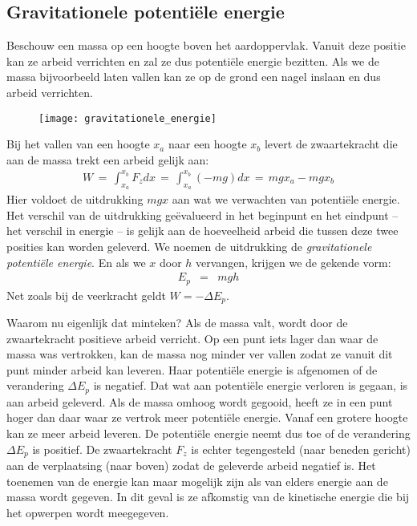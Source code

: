 \subsection{Gravitationele potenti\"ele energie}\label{gravitationele potentiele energie}

Beschouw een massa op een hoogte boven het aardoppervlak. Vanuit deze positie kan ze arbeid verrichten en zal ze dus potenti\"ele energie bezitten. Als we de massa bijvoorbeeld laten vallen kan ze op de grond een nagel inslaan en dus arbeid verrichten.
\begin{figure}[h]
\begin{center}
\texttt{[image: gravitationele\_energie]}
\end{center}
\end{figure}
Bij het vallen van een hoogte $x_a$ naar een hoogte $x_b$ levert de zwaartekracht die aan de massa trekt een arbeid gelijk aan:
\begin{eqnarray*}
W\,=\,\int_{x_a}^{x_b}F_zdx\,=\,\int_{x_a}^{x_b}(-mg)dx\,=\,mgx_a-mgx_b
\end{eqnarray*}
Hier voldoet de uitdrukking $mgx$ aan wat we verwachten van potenti\"ele ener\-gie. Het verschil van de uitdrukking ge\"evalueerd in het beginpunt en het eindpunt -- het verschil in energie -- is gelijk aan de hoeveelheid arbeid die tussen deze twee posities kan worden geleverd. We noemen de uitdrukking de \textit{gravitationele potenti\"ele energie}. En als we $x$ door $h$ vervangen, krijgen we de gekende vorm:
\begin{eqnarray}
E_p&=&mgh\label{Ep=mgh}
\end{eqnarray}
Net zoals bij de veerkracht geldt $W=-\Delta E_p$. 

Waarom nu eigenlijk dat minteken? Als de massa valt, wordt door de zwaartekracht positieve arbeid verricht. Op een punt iets lager dan waar de massa was vertrokken, kan de massa nog minder ver vallen zodat ze vanuit dit punt minder arbeid kan leveren. Haar potenti\"ele energie is afgenomen of de verandering $\Delta E_p$ is negatief. Dat wat aan potenti\"ele energie verloren is gegaan, is aan arbeid geleverd. Als de massa omhoog wordt gegooid, heeft ze in een punt hoger dan daar waar ze vertrok meer potenti\"ele energie. Vanaf een grotere hoogte kan ze meer arbeid leveren. De potenti\"ele energie neemt dus toe of de verandering $\Delta E_p$ is positief. De zwaartekracht $F_z$ is echter tegengesteld (naar beneden gericht) aan de verplaatsing (naar boven) zodat de geleverde arbeid negatief is. Het toenemen van de energie kan maar mogelijk zijn als van elders energie aan de massa wordt gegeven. In dit geval is ze afkomstig van de kinetische energie die bij het opwerpen wordt meegegeven.

